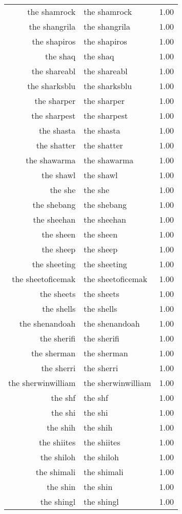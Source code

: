 \begin{table}[ht]
\begin{tabular}{rlr}
  the shamrock & the shamrock & 1.00 \\ 
  the shangrila & the shangrila & 1.00 \\ 
  the shapiros & the shapiros & 1.00 \\ 
  the shaq & the shaq & 1.00 \\ 
  the shareabl & the shareabl & 1.00 \\ 
  the sharksblu & the sharksblu & 1.00 \\ 
  the sharper & the sharper & 1.00 \\ 
  the sharpest & the sharpest & 1.00 \\ 
  the shasta & the shasta & 1.00 \\ 
  the shatter & the shatter & 1.00 \\ 
  the shawarma & the shawarma & 1.00 \\ 
  the shawl & the shawl & 1.00 \\ 
  the she & the she & 1.00 \\ 
  the shebang & the shebang & 1.00 \\ 
  the sheehan & the sheehan & 1.00 \\ 
  the sheen & the sheen & 1.00 \\ 
  the sheep & the sheep & 1.00 \\ 
  the sheeting & the sheeting & 1.00 \\ 
  the sheetoficemak & the sheetoficemak & 1.00 \\ 
  the sheets & the sheets & 1.00 \\ 
  the shells & the shells & 1.00 \\ 
  the shenandoah & the shenandoah & 1.00 \\ 
  the sherifi & the sherifi & 1.00 \\ 
  the sherman & the sherman & 1.00 \\ 
  the sherri & the sherri & 1.00 \\ 
  the sherwinwilliam & the sherwinwilliam & 1.00 \\ 
  the shf & the shf & 1.00 \\ 
  the shi & the shi & 1.00 \\ 
  the shih & the shih & 1.00 \\ 
  the shiites & the shiites & 1.00 \\ 
  the shiloh & the shiloh & 1.00 \\ 
  the shimali & the shimali & 1.00 \\ 
  the shin & the shin & 1.00 \\ 
  the shingl & the shingl & 1.00 \\ 

\end{tabular}
\end{table}
